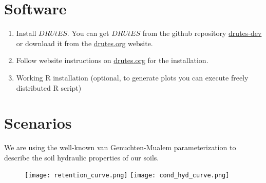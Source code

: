 \documentclass[
10pt, %
a4paper, %
oneside, %
headinclude,footinclude, %
BCOR5mm, %
]{scrartcl}
\begin{document}
\section{Software}

\begin{enumerate}
\item Install $DRUtES$. You can get $DRUtES$ from the github repository \href{https://github.com/michalkuraz/drutes-dev/} {drutes-dev} or download it from the \href{http://drutes.org/public/?core=account}{drutes.org} website. 
\item Follow website instructions on \href{http://drutes.org/public/?core=account}{drutes.org} for the installation.
\item Working R installation (optional, to generate plots you can execute freely distributed R script) 
\end{enumerate}

\newpage
\section{Scenarios}

We are using the well-known van Genuchten-Mualem parameterization to describe the soil hydraulic properties of our soils. 

\begin{table}[!h]
\centering
\caption{\label{tab_heat}Material properties needed for scenarios.}
\end{table}
\begin{figure}[!h]

\texttt{[image: retention\_curve.png]}
\texttt{[image: cond\_hyd\_curve.png]}
\end{figure}
\end{document}
